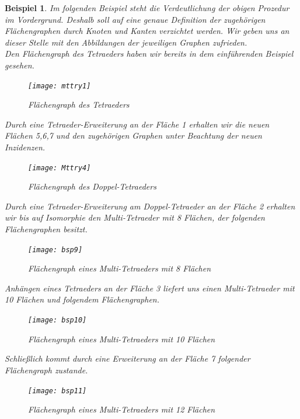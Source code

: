 \documentclass[12pt,titlepage,twoside,cleardoublepage]{article}
\theoremstyle{nummermitklammern}
\newtheorem{bsp}[temp]{Beispiel}
\newtheorem{bsp}[zahl]{Beispiel}
\numberwithin{equation}{section}
\begin{document}
\begin{bsp}
Im folgenden Beispiel steht die Verdeutlichung der obigen Prozedur im Vordergrund. Deshalb soll auf eine genaue Definition der zugehörigen Flächengraphen durch Knoten und Kanten verzichtet werden. Wir geben uns an dieser Stelle mit den Abbildungen der jeweiligen Graphen zufrieden. \\
Den Flächengraph des Tetraeders haben wir bereits in dem einführenden Beispiel gesehen.
\begin{figure}[H]
\begin{center}
\texttt{[image: mttry1]}

\end{center}
\caption{Flächengraph des Tetraeders}
\end{figure}
Durch eine Tetraeder-Erweiterung an der Fläche 1 erhalten wir die neuen Flächen 5,6,7 und den zugehörigen Graphen unter Beachtung der neuen Inzidenzen.
\begin{figure}[H]
\begin{center}
\texttt{[image: Mttry4]}
\end{center}
\caption{Flächengraph des Doppel-Tetraeders}
\end{figure}
Durch eine Tetraeder-Erweiterung am Doppel-Tetraeder an der Fläche 2 erhalten wir bis auf Isomorphie den Multi-Tetraeder mit 8 Flächen, der folgenden Flächengraphen besitzt. 
\begin{figure}[H]
\begin{center}
\texttt{[image: bsp9]}
\end{center}
\caption{Flächengraph eines Multi-Tetraeders mit 8 Flächen}
\end{figure}
Anhängen eines Tetraeders an der Fläche 3 liefert uns einen Multi-Tetraeder mit 10 Flächen und folgendem Flächengraphen.
\begin{figure}[H]
\begin{center}
\texttt{[image: bsp10]}
\end{center}
\caption{Flächengraph eines Multi-Tetraeders mit 10 Flächen}
\end{figure}
Schließlich kommt durch eine Erweiterung an der Fläche 7 folgender Flächengraph zustande.
\begin{figure}[H]
\begin{center}
\texttt{[image: bsp11]}
\end{center}
\caption{Flächengraph eines Multi-Tetraeders mit 12 Flächen}
\end{figure}
\end{bsp}
\end{document}
